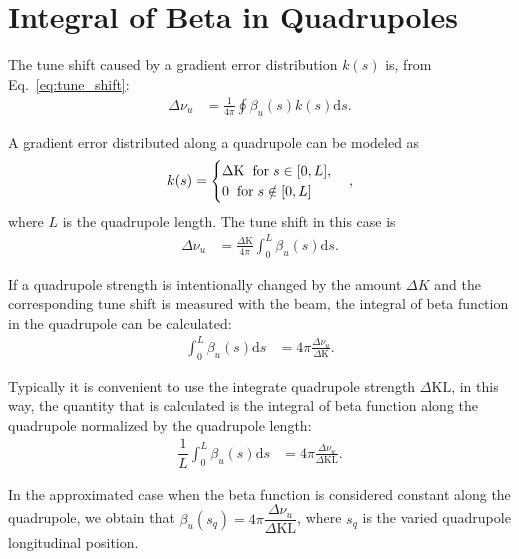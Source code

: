 \chapter{Integral of Beta in Quadrupoles}\label{appendix:beta}
The tune shift caused by a gradient error distribution $k(s)$ is, from Eq.~\eqref{eq:tune_shift}:
\begin{align}
    \Delta\nu_u &= \frac{1}{4\pi} \oint \beta_u(s) k(s) \mathrm{d}s.
\end{align}

A gradient error distributed along a quadrupole can be modeled as
\begin{equation}
    k(s) = 
\begin{cases}
\Delta \mathrm{K} \hspace{0.2cm} \text{for} \hspace{0.1cm} s \in [0, L], \\
0 \hspace{0.2cm} \text{for} \hspace{0.1cm} s \notin [0, L]
\end{cases},
\end{equation}
where $L$ is the quadrupole length. The tune shift in this case is
\begin{align}
    \Delta\nu_u &= \frac{\Delta \mathrm{K}}{4\pi} \int_{0}^{L} \beta_u(s)\mathrm{d}s.
\end{align}

If a quadrupole strength is intentionally changed by the amount $\Delta K$ and the corresponding tune shift is measured with the beam, the integral of beta function in the quadrupole can be calculated:
\begin{align}
\int_{0}^{L} \beta_u(s) \mathrm{d}s &= 4\pi\frac{\Delta \nu_u}{\Delta \mathrm{K}}.
\end{align}

Typically it is convenient to use the integrate quadrupole strength $\Delta \mathrm{KL}$, in this way, the quantity that is calculated is the integral of beta function along the quadrupole normalized by the quadrupole length:
\begin{align}
\dfrac{1}{L}\int_{0}^{L} \beta_u(s) \mathrm{d}s &= 4\pi\frac{\Delta \nu_u}{\Delta \mathrm{KL}}.
\end{align}

In the approximated case when the beta function is considered constant along the quadrupole, we obtain that $\beta_u(s_q) = 4\pi \dfrac{\Delta \nu_u}{\Delta \mathrm{KL}}$, where $s_q$ is the varied quadrupole longitudinal position.

